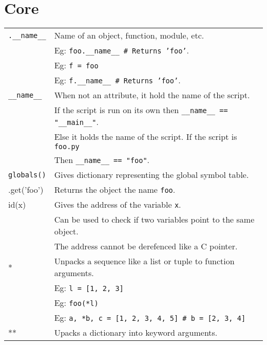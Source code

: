 \section{Core}

\begin{tabularx}{\linewidth}{lX}
    \texttt{.\_\_name\_\_}           & Name of an object, function, module, etc.\\
                                    & Eg: \texttt{foo.\_\_name\_\_ \# Returns 'foo'}.\\ 
                                    & Eg: \texttt{f = foo}\\
                                    & Eg: \texttt{f.\_\_name\_\_ \# Returns 'foo'}.\\
    \texttt{\_\_name\_\_}           & When not an attribute, it hold the name of the script.\\
                                    & If the script is run on its own then \texttt{\_\_name\_\_ == "\_\_main\_\_"}.\\
                                    & Else it holds the name of the script. If the script is \texttt{foo.py}\\
                                    & Then \texttt{\_\_name\_\_ == "foo"}.\\
    \hline
    \texttt{globals()}              & Gives dictionary representing the global symbol table.\\
    .get('foo')                     & Returns the object the name \texttt{foo}.\\
    \hline
    id(x)                           & Gives the address of the variable \texttt{x}.\\ 
                                    & Can be used to check if two variables point to the same object.\\
                                    & The address cannot be derefenced like a C pointer.\\
    \hline
    *                               & Unpacks a sequence like a list or tuple to function arguments.\\
                                    & Eg: \texttt{l = [1, 2, 3]}\\
                                    & Eg: \texttt{foo(*l)}\\
                                    & Eg: \texttt{a, *b, c = [1, 2, 3, 4, 5] \# b = [2, 3, 4]}\\
    **                              & Upacks a dictionary into keyword arguments.\\

\end{tabularx}
